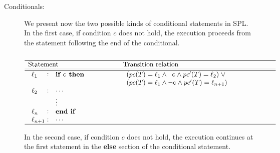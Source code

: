 \begin{description}
	\item [Conditionals:]
		We present now the two possible kinds of conditional statements in 
		SPL.
%
		In the first case, if condition $c$ does not hold, the execution 
		proceeds from the statement following the end of the conditional.

		\[
        \begin{array}[t]{p{8em}@{\hspace{6em}}p{\longtablesize}}
				\hline
				Statement & Transition relation \\ \hline\hline
				$\begin{array}[t]{l@{\hspace{0.3em}}c@{\hspace{1em}}l}
					\ell_1 & : & \mathtt{\textbf{if } c \textbf{ then }} \\ \\
					\ell_2 & : & \mathtt{\cdots} \\
						&& \mathtt{\vdots} \\
					\ell_n & : & \mathtt{\textbf{end if}} \\
					\ell_{n+1} & : & \mathtt{\cdots}
				\end{array}$
				&
				$\begin{array}[t]{ll}
					(\pc(T) = \ell_1 \andcond \;\;\mathtt{c} \andcond \pc'(T) = \ell_2) \; \Or \\
					(\pc(T) = \ell_1 \andcond \lnot \mathtt{c} \andcond \pc'(T) = \ell_{n+1})
				 \end{array}$ \\ \hline
			 \end{array}
		 \]

		In the second case, if condition $c$ does not hold, the execution 
		continues at the first statement in the \textbf{else} section of the 
		conditional statement.


\end{description}

